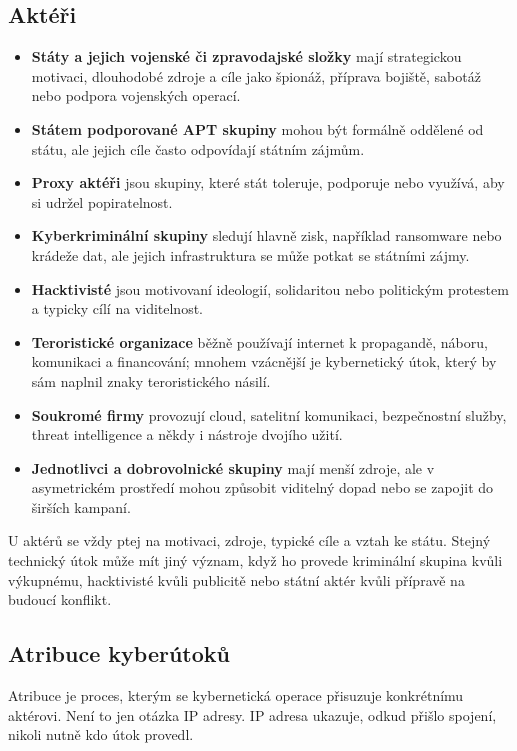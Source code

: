\documentclass[11pt,a4paper]{article}
\begin{document}
\subsection*{Aktéři}
\begin{itemize}
  \item \textbf{Státy a jejich vojenské či zpravodajské složky} mají strategickou motivaci, dlouhodobé zdroje a cíle jako špionáž, příprava bojiště, sabotáž nebo podpora vojenských operací.
  \item \textbf{Státem podporované APT skupiny} mohou být formálně oddělené od státu, ale jejich cíle často odpovídají státním zájmům.
  \item \textbf{Proxy aktéři} jsou skupiny, které stát toleruje, podporuje nebo využívá, aby si udržel popiratelnost.
  \item \textbf{Kyberkriminální skupiny} sledují hlavně zisk, například ransomware nebo krádeže dat, ale jejich infrastruktura se může potkat se státními zájmy.
  \item \textbf{Hacktivisté} jsou motivovaní ideologií, solidaritou nebo politickým protestem a typicky cílí na viditelnost.
  \item \textbf{Teroristické organizace} běžně používají internet k propagandě, náboru, komunikaci a financování; mnohem vzácnější je kybernetický útok, který by sám naplnil znaky teroristického násilí.
  \item \textbf{Soukromé firmy} provozují cloud, satelitní komunikaci, bezpečnostní služby, threat intelligence a někdy i nástroje dvojího užití.
  \item \textbf{Jednotlivci a dobrovolnické skupiny} mají menší zdroje, ale v asymetrickém prostředí mohou způsobit viditelný dopad nebo se zapojit do širších kampaní.
\end{itemize}
U aktérů se vždy ptej na motivaci, zdroje, typické cíle a vztah ke státu. Stejný technický útok může mít jiný význam, když ho provede kriminální skupina kvůli výkupnému, hacktivisté kvůli publicitě nebo státní aktér kvůli přípravě na budoucí konflikt.

\subsection*{Atribuce kyberútoků}
Atribuce je proces, kterým se kybernetická operace přisuzuje konkrétnímu aktérovi. Není to jen otázka IP adresy. IP adresa ukazuje, odkud přišlo spojení, nikoli nutně kdo útok provedl.
\end{document}
